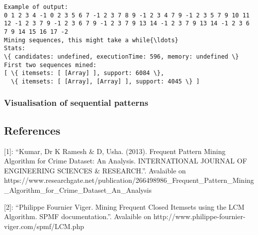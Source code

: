 \documentclass[11pt]{article}
\begin{document}
    \begin{Verbatim}[commandchars=\\\{\}]
Example of output:
0 1 2 3 4 -1 0 2 3 5 6 7 -1 2 3 7 8 9 -1 2 3 4 7 9 -1 2 3 5 7 9 10 11 12 -1 2 3 7 9 -1 2 3 6 7 9 -1 2 3 7 9 13 14 -1 2 3 7 9 13 14 -1 2 3 6 7 9 14 15 16 17 -2
Mining sequences, this might take a while{\ldots}
Stats:
\{ candidates: undefined, executionTime: 596, memory: undefined \}
First two sequences mined:
[ \{ itemsets: [ [Array] ], support: 6084 \},
  \{ itemsets: [ [Array], [Array] ], support: 4045 \} ]

    \end{Verbatim}

    \hypertarget{visualisation-of-sequential-patterns}{%
\subsubsection{Visualisation of sequential
patterns}\label{visualisation-of-sequential-patterns}}

    \hypertarget{references}{%
\subsection{References}\label{references}}

{[}1{]}: ``Kumar, Dr K Ramesh \& D, Usha. (2013). Frequent Pattern
Mining Algorithm for Crime Dataset: An Analysis. INTERNATIONAL JOURNAL
OF ENGINEERING SCIENCES \& RESEARCH.''. Avalaible on
https://www.researchgate.net/publication/266498986\_Frequent\_Pattern\_Mining\_Algorithm\_for\_Crime\_Dataset\_An\_Analysis

{[}2{]}: ``Philippe Fournier Viger. Mining Frequent Closed Itemsets
using the LCM Algorithm. SPMF documentation.''. Avalaible on
http://www.philippe-fournier-viger.com/spmf/LCM.php


    
    
    
    
\end{document}
